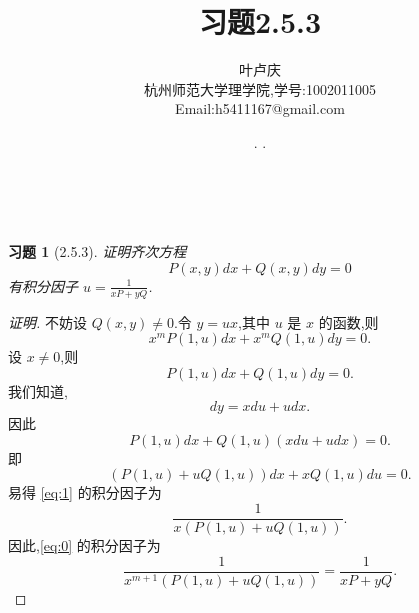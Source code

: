 \documentclass[a4paper, 12pt]{article} %
\makeatletter
\newtheorem*{cdtheorem}{习题}
\newenvironment{exercise}
{\bigskip\begin{mdframed}[backgroundcolor=gray!40,rightline=false,leftline=false,topline=false,bottomline=false]\begin{cdtheorem}}
    {\end{cdtheorem}\end{mdframed}\bigskip}
\renewcommand{\maketitle}{ %
  \renewcommand\refname{参考文献}
  \newcommand{\D}{\displaystyle}\newcommand{\ri}{\Rightarrow}
  \newcommand{\ds}{\displaystyle} \renewcommand{\ni}{\noindent}
  \newcommand{\pa}{\partial} \newcommand{\Om}{\Omega}
  \newcommand{\om}{\omega} \newcommand{\sik}{\sum_{i=1}^k}
  \newcommand{\vov}{\Vert\omega\Vert} \newcommand{\Umy}{U_{\mu_i,y^i}}
  \newcommand{\lamns}{\lambda_n^{^{\scriptstyle\sigma}}}
  \newcommand{\chiomn}{\chi_{_{\Omega_n}}}
  \newcommand{\ullim}{\underline{\lim}} \newcommand{\bsy}{\boldsymbol}
  \newcommand{\mvb}{\mathversion{bold}} \newcommand{\la}{\lambda}
  \newcommand{\La}{\Lambda} \newcommand{\va}{\varepsilon}
  \newcommand{\be}{\beta} \newcommand{\al}{\alpha}
  \newcommand{\dis}{\displaystyle} \newcommand{\R}{{\mathbb R}}
  \newcommand{\N}{{\mathbb N}} \newcommand{\cF}{{\mathcal F}}
  \newcommand{\gB}{{\mathfrak B}} \newcommand{\eps}{\epsilon}
  \begin{flushright} %
    {\LARGE\@title} %
    
    \vspace{50pt} %
    
    {\large\@author} %
    \\\@date %
    
    \vspace{40pt} %
  \end{flushright}
}
\makeatother
\begin{document}
\begin{CJK}{UTF8}{gkai}
  \title{\textbf{习题2.5.3}} 
  \author{\small{叶卢庆}\\{\small{杭州师范大学理学院,学号:1002011005}}\\{\small{Email:h5411167@gmail.com}}} %
  \renewcommand{\today}{\number\year. \number\month. \number\day}
  \date{\today} %
  
  
  
  \maketitle %
  
  
  
  
  
  
  
  \begin{exercise}[2.5.3]
证明齐次方程
\begin{equation}
  \label{eq:0}
  P(x,y)dx+Q(x,y)dy=0
\end{equation}
有积分因子 $u=\frac{1}{xP+yQ}$.    
  \end{exercise}
  \begin{proof}[证明]
不妨设 $Q(x,y)\neq 0$.令 $y=ux$,其中 $u$ 是 $x$ 的函数,则
$$
x^mP(1,u)dx+x^mQ(1,u)dy=0.
$$
设 $x\neq 0$,则
$$
P(1,u)dx+Q(1,u)dy=0.
$$
我们知道,
$$
dy=xdu+udx.
$$
因此
$$
P(1,u)dx+Q(1,u)(xdu+udx)=0.
$$
即
\begin{equation}
  \label{eq:1}
  (P(1,u)+uQ(1,u))dx+xQ(1,u)du=0.
\end{equation}
易得 \eqref{eq:1} 的积分因子为
$$
\frac{1}{x(P(1,u)+uQ(1,u))}.
$$
因此,\eqref{eq:0} 的积分因子为
$$
\frac{1}{x^{m+1}(P(1,u)+uQ(1,u))}=\frac{1}{xP+yQ}.
$$
\begin{comment}
令 $y=ux$,其中 $u$ 是 $x$ 的函数.则我们得到
$$
x^mP(1,u)dx+x^mQ(1,u)dy=0.
$$
\end{comment}



\end{proof}
\end{CJK}
\end{document}
